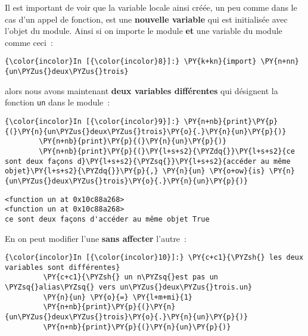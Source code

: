     Il est important de voir que la variable locale ainsi créée, un peu
comme dans le cas d'un appel de fonction, est une \textbf{nouvelle
variable} qui est initialisée avec l'objet du module. Ainsi si on
importe le module \textbf{et} une variable du module comme ceci~:

    \begin{Verbatim}[commandchars=\\\{\},frame=single,framerule=0.3mm,rulecolor=\color{cellframecolor}]
{\color{incolor}In [{\color{incolor}8}]:} \PY{k+kn}{import} \PY{n+nn}{un\PYZus{}deux\PYZus{}trois}
\end{Verbatim}


    alors nous avons maintenant \textbf{deux variables différentes} qui
désignent la fonction \texttt{un} dans le module~:

    \begin{Verbatim}[commandchars=\\\{\},frame=single,framerule=0.3mm,rulecolor=\color{cellframecolor}]
{\color{incolor}In [{\color{incolor}9}]:} \PY{n+nb}{print}\PY{p}{(}\PY{n}{un\PYZus{}deux\PYZus{}trois}\PY{o}{.}\PY{n}{un}\PY{p}{)}
        \PY{n+nb}{print}\PY{p}{(}\PY{n}{un}\PY{p}{)}
        \PY{n+nb}{print}\PY{p}{(}\PY{l+s+s2}{\PYZdq{}}\PY{l+s+s2}{ce sont deux façons d}\PY{l+s+s2}{\PYZsq{}}\PY{l+s+s2}{accéder au même objet}\PY{l+s+s2}{\PYZdq{}}\PY{p}{,} \PY{n}{un} \PY{o+ow}{is} \PY{n}{un\PYZus{}deux\PYZus{}trois}\PY{o}{.}\PY{n}{un}\PY{p}{)}
\end{Verbatim}


    \begin{Verbatim}[commandchars=\\\{\},frame=single,framerule=0.3mm,rulecolor=\color{cellframecolor}]
<function un at 0x10c88a268>
<function un at 0x10c88a268>
ce sont deux façons d'accéder au même objet True
\end{Verbatim}

    En on peut modifier l'une \textbf{sans affecter} l'autre~:

    \begin{Verbatim}[commandchars=\\\{\},frame=single,framerule=0.3mm,rulecolor=\color{cellframecolor}]
{\color{incolor}In [{\color{incolor}10}]:} \PY{c+c1}{\PYZsh{} les deux variables sont différentes}
         \PY{c+c1}{\PYZsh{} un n\PYZsq{}est pas un \PYZsq{}alias\PYZsq{} vers un\PYZus{}deux\PYZus{}trois.un}
         \PY{n}{un} \PY{o}{=} \PY{l+m+mi}{1}
         \PY{n+nb}{print}\PY{p}{(}\PY{n}{un\PYZus{}deux\PYZus{}trois}\PY{o}{.}\PY{n}{un}\PY{p}{)}
         \PY{n+nb}{print}\PY{p}{(}\PY{n}{un}\PY{p}{)}
\end{Verbatim}


